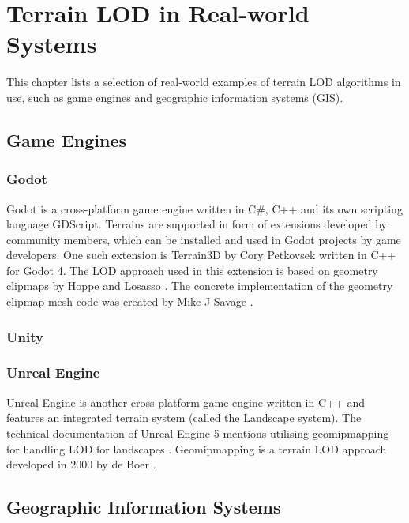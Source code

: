 \chapter{Terrain LOD in Real-world Systems}
This chapter lists a selection of real-world examples of terrain LOD algorithms in use,
such as game engines and geographic information systems (GIS).
\section{Game Engines}
\subsection{Godot}
Godot is a cross-platform game engine written in C\#, C++ and its own scripting language GDScript.
Terrains are supported in form of extensions developed by community members, which can be installed and used in Godot projects by game developers.
One such extension is Terrain3D by Cory Petkovsek \cite{godotterrain3dgithub} 
written in C++ for Godot 4. The LOD approach used in this extension is based on 
geometry clipmaps by Hoppe and Losasso \cite{geomclipmaps}. %
The concrete implementation
of the geometry clipmap mesh code was created by Mike J Savage \cite{geomclipmapssavage}. 
\subsection{Unity}
\subsection{Unreal Engine}
Unreal Engine is another cross-platform game engine written in C++ and features
an integrated terrain system (called the Landscape system).
The technical documentation of Unreal Engine 5 mentions utilising geomipmapping for 
handling LOD for landscapes \cite{unrealengine5doc}. Geomipmapping is a terrain LOD approach developed 
in 2000 by de Boer \cite{geomipmapping}. %
\section{Geographic Information Systems}
